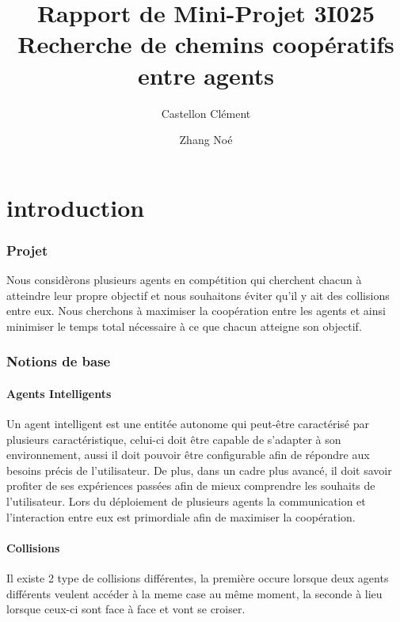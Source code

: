 \documentclass{article}
\begin{document}
	
	\title{Rapport de Mini-Projet 3I025 \\
		\large Recherche de chemins coopératifs entre agents}
	\author{Castellon Clément \and Zhang Noé}
	\maketitle
	
	\part{introduction}
	
		\section{Projet}
		
			Nous considèrons plusieurs agents en compétition qui cherchent chacun à atteindre leur propre objectif et nous souhaitons éviter qu'il y ait des collisions entre eux.
			Nous cherchons à maximiser la coopération entre les agents et ainsi minimiser le temps total nécessaire à ce que chacun atteigne son objectif.
			
		\section{Notions de base}
	
			\subsection{Agents Intelligents}
			Un agent intelligent est une entitée autonome qui peut-être caractérisé par plusieurs caractéristique, celui-ci doit être capable de s'adapter à son environnement, aussi il doit pouvoir être configurable afin de répondre aux besoins précis de l'utilisateur. De plus, dans un cadre plus avancé, il doit savoir profiter de ses expériences passées afin de mieux comprendre les souhaits de l'utilisateur. Lors du déploiement de plusieurs agents la communication et l'interaction entre eux est primordiale afin de maximiser la coopération. %
			
			\subsection{Collisions}
				Il existe 2 type de collisions différentes, la première occure lorsque deux agents différents veulent accéder à la meme case au même moment, la seconde à lieu lorsque ceux-ci sont face à face et vont se croiser.
			
\end{document}
